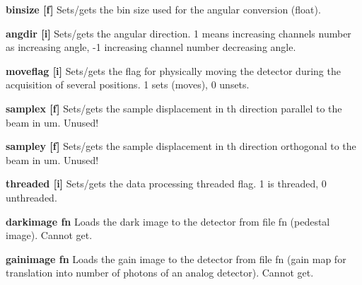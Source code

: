 \begin{DoxyItemize}
\item {\bfseries binsize \mbox{[}f\mbox{]}} Sets/gets the bin size used for the angular conversion (float).
\end{DoxyItemize}


\begin{DoxyItemize}
\item {\bfseries angdir \mbox{[}i\mbox{]}} Sets/gets the angular direction. 1 means increasing channels number as increasing angle, -\/1 increasing channel number decreasing angle.
\end{DoxyItemize}


\begin{DoxyItemize}
\item {\bfseries moveflag \mbox{[}i\mbox{]}} Sets/gets the flag for physically moving the detector during the acquisition of several positions. 1 sets (moves), 0 unsets.
\end{DoxyItemize}


\begin{DoxyItemize}
\item {\bfseries samplex \mbox{[}f\mbox{]}} Sets/gets the sample displacement in th direction parallel to the beam in um. Unused!
\end{DoxyItemize}


\begin{DoxyItemize}
\item {\bfseries sampley \mbox{[}f\mbox{]}} Sets/gets the sample displacement in th direction orthogonal to the beam in um. Unused!
\end{DoxyItemize}


\begin{DoxyItemize}
\item {\bfseries threaded \mbox{[}i\mbox{]}} Sets/gets the data processing threaded flag. 1 is threaded, 0 unthreaded.
\end{DoxyItemize}


\begin{DoxyItemize}
\item {\bfseries darkimage fn} Loads the dark image to the detector from file fn (pedestal image). Cannot get.
\end{DoxyItemize}


\begin{DoxyItemize}
\item {\bfseries gainimage fn} Loads the gain image to the detector from file fn (gain map for translation into number of photons of an analog detector). Cannot get. 
\end{DoxyItemize}
